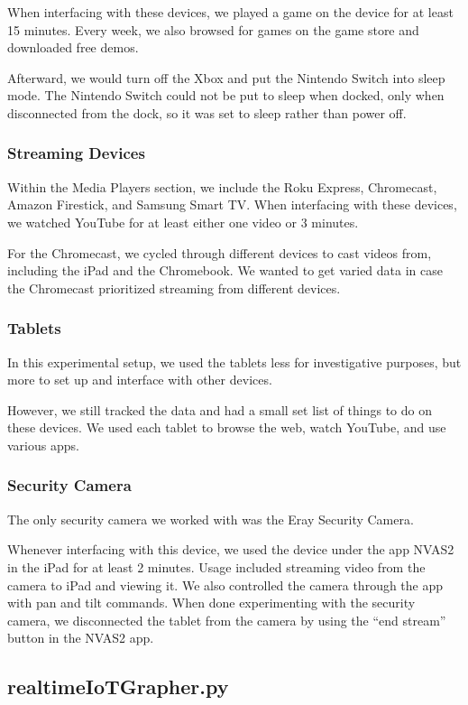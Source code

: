 When interfacing with these devices, we played a game on the device for at least 15 minutes. Every week, we also browsed for games on the game store and downloaded free demos.

Afterward, we would turn off the Xbox and put the Nintendo Switch into sleep mode. The Nintendo Switch could not be put to sleep when docked, only when disconnected from the dock, so it was set to sleep rather than power off.

\subsubsection{Streaming Devices}

Within the Media Players section, we include the Roku Express, Chromecast, Amazon Firestick, and Samsung Smart TV. When interfacing with these devices, we watched YouTube for at least either one video or 3 minutes.

For the Chromecast, we cycled through different devices to cast videos from, including the iPad and the Chromebook. We wanted to get varied data in case the Chromecast prioritized streaming from different devices.

\subsubsection{Tablets}
In this experimental setup, we used the tablets less for investigative purposes, but more to set up and interface with other devices.

However, we still tracked the data and had a small set list of things to do on these devices. We used each tablet to browse the web, watch YouTube, and use various apps.

\subsubsection{Security Camera}

The only security camera we worked with was the Eray Security Camera.

Whenever interfacing with this device, we used the device under the app NVAS2 in the iPad for at least 2 minutes. Usage included streaming video from the camera to iPad and viewing it. We also controlled the camera through the app with pan and tilt commands. When done experimenting with the security camera, we disconnected the tablet from the camera by using the ``end stream'' button in the NVAS2 app.

\subsection{realtimeIoTGrapher.py}
\label{realtimeIoTGrapher.py}


